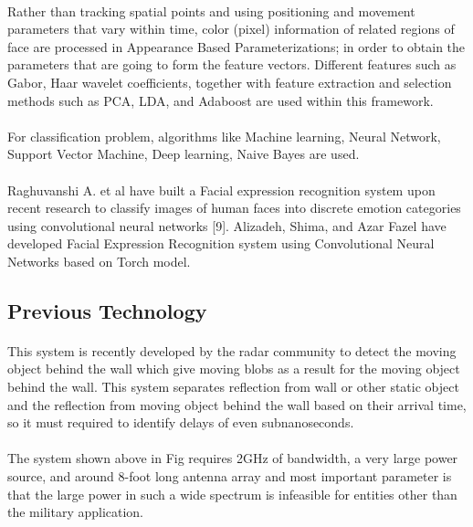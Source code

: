 \documentclass[a4paper,12pt,oneside]{article}
\begin{document}
\paragraph{}
Rather than tracking spatial points and using positioning and movement parameters that vary
within time, color (pixel) information of related regions of face are processed in Appearance
Based Parameterizations; in order to obtain the parameters that are going to form the feature vectors. Different features such as Gabor, Haar wavelet coefficients, together with feature
extraction and selection methods such as PCA, LDA, and Adaboost are used within this
framework.
\paragraph{}
For classification problem, algorithms like Machine learning, Neural Network, Support Vector
Machine, Deep learning, Naive Bayes are used.
\paragraph{}
Raghuvanshi A. et al have built a Facial expression recognition system upon recent research to
classify images of human faces into discrete emotion categories using convolutional neural
networks [9]. Alizadeh, Shima, and Azar Fazel have developed Facial Expression Recognition
system using Convolutional Neural Networks based on Torch model.

\subsection{Previous Technology}

\paragraph{}
This system is recently developed by the radar community to detect the moving object
behind the wall which give moving blobs as a result for the moving object behind the wall. This
system separates reflection from wall or other static object and the reflection from moving object
behind the wall based on their arrival time, so it must required to identify delays of even subnanoseconds.

\paragraph{}
The system shown above in Fig requires 2GHz of bandwidth, a very large power
source, and around 8-foot long antenna array and most important parameter is that the large
power in such a wide spectrum is infeasible for entities other than the military application.
\end{document}
